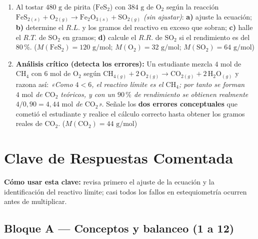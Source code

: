 \documentclass[12pt, letterpaper]{article}
\newcommand{\pc}{\text{\%}}
\begin{document}
\begin{enumerate}[leftmargin=*, start=45]
  \item \muyDificil{}\hspace{0.55em}Al tostar $480\text{ g}$ de pirita ($\text{FeS}_2$) con $384\text{ g}$ de $\text{O}_2$ según la reacción $\text{FeS}_{2(s)} + \text{O}_{2(g)} \longrightarrow \text{Fe}_2\text{O}_{3(s)} + \text{SO}_{2(g)}$ \emph{(sin ajustar)}: \textbf{a)} ajuste la ecuación; \textbf{b)} determine el $R.L.$ y los gramos del reactivo en exceso que sobran; \textbf{c)} halle el $R.T.$ de $\text{SO}_2$ en gramos; \textbf{d)} calcule el $R.R.$ de $\text{SO}_2$ si el rendimiento es del $80\,\pc$. ($M(\text{FeS}_2) = 120\text{ g/mol}$; $M(\text{O}_2) = 32\text{ g/mol}$; $M(\text{SO}_2) = 64\text{ g/mol}$)

  \item \muyDificil{}\hspace{0.55em}\textbf{Análisis crítico (detecta los errores):} Un estudiante mezcla $4\text{ mol}$ de $\text{CH}_4$ con $6\text{ mol}$ de $\text{O}_2$ según $\text{CH}_{4(g)} + 2\,\text{O}_{2(g)} \longrightarrow \text{CO}_{2(g)} + 2\,\text{H}_2\text{O}_{(g)}$ y razona así:
        \emph{«Como $4 < 6$, el reactivo límite es el $\text{CH}_4$; por tanto se forman $4\text{ mol}$ de $\text{CO}_2$ teóricos, y con un $90\,\pc$ de rendimiento se obtienen realmente $4 / 0{,}90 = 4{,}44\text{ mol}$ de $\text{CO}_2$».}
        Señale los \textbf{dos errores conceptuales} que cometió el estudiante y realice el cálculo correcto hasta obtener los gramos reales de $\text{CO}_2$. ($M(\text{CO}_2) = 44\text{ g/mol}$)

\end{enumerate}

\ifmwclaves
\newpage
\section{Clave de Respuestas Comentada}

\begin{cuadroinfo}
  \small
  \textbf{Cómo usar esta clave:} revisa primero el ajuste de la ecuación y la identificación del reactivo límite; casi todos los fallos en estequiometría ocurren antes de multiplicar.
\end{cuadroinfo}

\subsection*{Bloque A — Conceptos y balanceo (1 a 12)}
\end{document}
